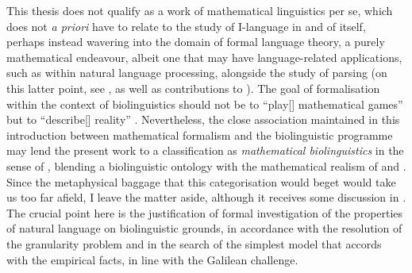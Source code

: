 This thesis does not qualify as a work of mathematical linguistics per se, which does not \textit{a priori} have to relate to the study of I-language in and of itself, perhaps instead wavering into the domain of formal language theory, a purely mathematical endeavour, albeit one that may have language-related applications, such as within natural language processing, alongside the study of parsing (on this latter point, see , as well as contributions to ). The goal of formalisation within the context of biolinguistics should not be to ``play[] mathematical games'' but to ``describe[] reality'' \parencite[81]{ChomskyN_1975a}. Nevertheless, the close association maintained in this introduction between mathematical formalism and the biolinguistic programme may lend the present work to a classification as \textit{mathematical biolinguistics} in the sense of \textcite{WatumullJ_2012, WatumullJ_2013}, blending a biolinguistic ontology with the mathematical realism of \textcite{CohenM_2008} and \textcite{TegmarkM_2014}. Since the metaphysical baggage that this categorisation would beget would take us too far afield, I leave the matter aside, although it receives some discussion in \textcite[Section 2]{VanSteeneL_2021}. The crucial point here is the justification of formal investigation of the properties of natural language on biolinguistic grounds, in accordance with the resolution of the granularity problem and in the search of the simplest model that accords with the empirical facts, in line with the Galilean challenge.

